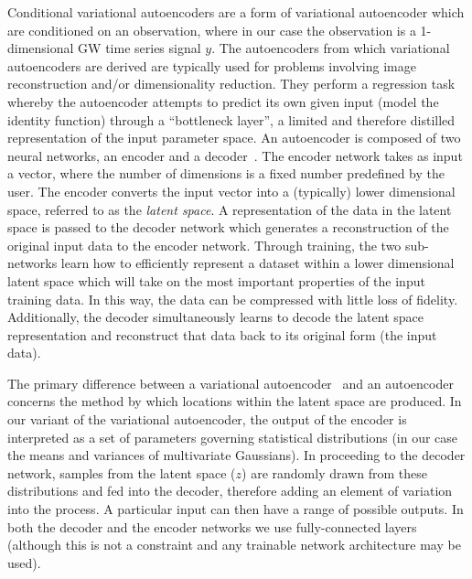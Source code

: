 \documentclass[%
showpacs,
 amsmath,amssymb,
 aps,
 twocolumn,
 prl,
 reprint,
floatfix,
]{revtex4-1}
\begin{document}
%
%
Conditional variational autoencoders are a form of variational autoencoder
which are conditioned on an observation, where in our case the observation is a
1-dimensional \ac{GW} time series signal $y$. The autoencoders from which
variational autoencoders are derived are typically used for problems involving
image reconstruction and/or dimensionality reduction. They perform a regression
task whereby the autoencoder attempts to predict its own given input (model the
identity function) through a ``bottleneck layer'', a limited  and therefore distilled representation of
the input parameter space. An autoencoder is composed of two neural networks,
an encoder and a decoder~\cite{gallinari1987memoires}. %
The encoder network takes as
input a vector, where the number of dimensions is a fixed number predefined by
the user. The encoder converts the input vector into a (typically) lower
dimensional space, referred to as the {\it{latent space}}. A representation of
the data in the latent space is passed to the decoder network which generates a
reconstruction of the original input data to the encoder network. Through
training, the two sub-networks learn how to efficiently represent a dataset
within a lower dimensional latent space which will take on the most important
properties of the input training data. In this way, the data can be compressed
with little loss of fidelity. Additionally, the decoder simultaneously learns
to decode the latent space representation and reconstruct that data back to its
original form (the input data).

%
%
The primary difference between a variational autoencoder~\cite{1812.04405} and
an autoencoder concerns the method by which locations within the latent space
are produced. In our variant of the variational autoencoder, the output of the
encoder is interpreted as a set of parameters governing statistical
distributions (in our case the means and variances of multivariate Gaussians).
In proceeding to the decoder network, samples from the latent space ($z$) are
randomly drawn from these distributions and fed into the decoder, therefore
adding an element of variation into the process. A particular input can then
have a range of possible outputs. In both the decoder and the encoder networks
we use fully-connected layers (although this is not a constraint and any
trainable network architecture may be used).

\end{document}

